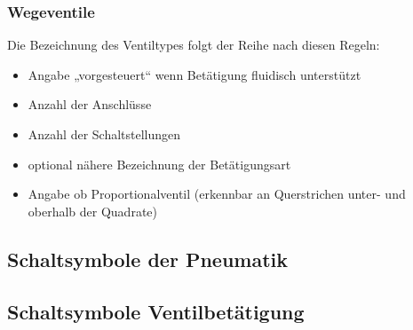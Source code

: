 \subsubsection{Wegeventile}
Die Bezeichnung des Ventiltypes folgt der Reihe nach diesen Regeln:
\begin{itemize}
\item  Angabe „vorgesteuert“ wenn Betätigung fluidisch unterstützt
\item Anzahl der Anschlüsse
\item Anzahl der Schaltstellungen
\item optional nähere Bezeichnung der Betätigungsart 
\item Angabe ob Proportionalventil (erkennbar an Querstrichen unter- und oberhalb der Quadrate)
\end{itemize}
\subsection{Schaltsymbole der Pneumatik}

\subsection{Schaltsymbole Ventilbetätigung}



